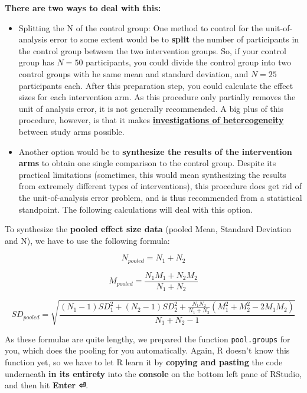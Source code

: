 \documentclass[]{book}
\providecommand{\tightlist}{%
  \setlength{\itemsep}{0pt}\setlength{\parskip}{0pt}}
\begin{document}
\textbf{There are two ways to deal with this:}

\begin{itemize}
\tightlist
\item
  Splitting the N of the control group: One method to control for the unit-of-analysis error to some extent would be to \textbf{split} the number of participants in the control group between the two intervention groups. So, if your control group has \(N=50\) participants, you could divide the control group into two control groups with he same mean and standard deviation, and \(N=25\) participants each. After this preparation step, you could calculate the effect sizes for each intervention arm. As this procedure only partially removes the unit of analysis error, it is not generally recommended. A big plus of this procedure, however, is that it makes \protect\hyperlink{heterogeneity}{\textbf{investigations of hetereogeneity}} between study arms possible.
\item
  Another option would be to \textbf{synthesize the results of the intervention arms} to obtain one single comparison to the control group. Despite its practical limitations (sometimes, this would mean synthesizing the results from extremely different types of interventions), this procedure does get rid of the unit-of-analysis error problem, and is thus recommended from a statistical standpoint. The following calculations will deal with this option.
\end{itemize}

To synthesize the \textbf{pooled effect size data} (pooled Mean, Standard Deviation and N), we have to use the following formula:

\[N_{pooled}=N_1+N_2\]

\[M_{pooled}=\frac{N_1M_1+N_2M_2}{N_1+N_2}\]

\[SD_{pooled} = \sqrt{\frac{(N_1-1)SD^{2}_{1}+ (N_2-1)SD^{2}_{2}+\frac{N_1N_2}{N_1+N_2}(M^{2}_1+M^{2}_2-2M_1M_2)} {N_1+N_2-1}}\]

As these formulae are quite lengthy, we prepared the function \texttt{pool.groups} for you, which does the pooling for you automatically. Again, R doesn't know this function yet, so we have to let R learn it by \textbf{copying and pasting} the code underneath \textbf{in its entirety} into the \textbf{console} on the bottom left pane of RStudio, and then hit \textbf{Enter ⏎}.
\end{document}
